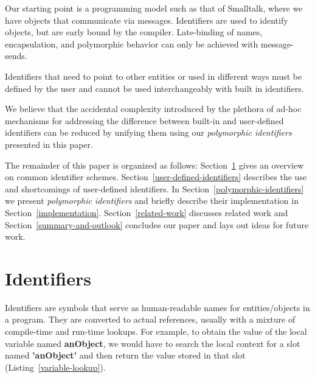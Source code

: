 \documentclass[preprint,authoryear]{acm_proc_article-sp}
\begin{document}
Our starting point is a programming model such as that of Smalltalk, where we have objects
that communicate via messages\cite{Goldberg1983}.   Identifiers are used to identify 
objects, but are early bound by the compiler.  Late-binding of names, encapsulation,
and polymorphic behavior can only be achieved with message-sends.

Identifiers that need to point to other entities or used in different ways must be defined
by the user and cannot be used interchangeably with built in identifiers.  

We believe that the accidental complexity introduced by the
plethora of ad-hoc mechanisms for addressing the difference between built-in 
and user-defined identifiers can be reduced 
by unifying them using our \emph{polymorphic identifiers} presented in this paper.

The remainder of this paper is organized as follows: 
Section~\ref{identifiers} gives an overview on common identifier schemes.
Section~\ref{user-defined-identifiers} describes the use and shortcomings of user-defined identifiers.
In Section~\ref{polymorphic-identifiers} we present \emph{polymorphic identifiers} and briefly describe their implementation in Section~\ref{implementation}.
Section~\ref{related-work} discusses related work and Section~\ref{summary-and-outlook} concludes our paper and lays out ideas for future work.


\section{Identifiers}
\label{identifiers}

Identifiers are symbols that serve as human-readable names for entities/objects
in a program.  They are converted to actual references, usually with a mixture of
compile-time and run-time lookups.  For example, to obtain the value of the local
variable named {\bf anObject}, we would have to search the local context for
a slot named {\bf 'anObject'} and then return the value stored in that slot (Listing~\ref{variable-lookup}).

\end{document}

